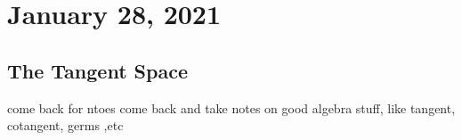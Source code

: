 \section{January 28, 2021}
\subsection{The Tangent Space}
come back for ntoes
{\color{red} come back and take notes on good algebra stuff, like tangent, cotangent, germs ,etc}
